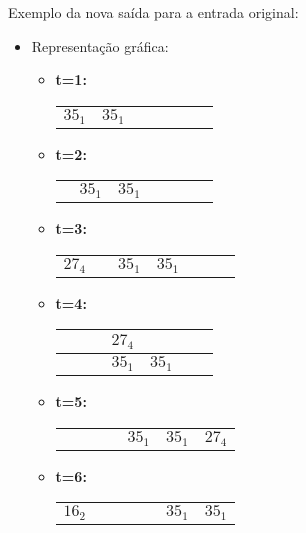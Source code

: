 Exemplo da nova saída para a entrada original:
\begin{itemize}
    \item Representação gráfica:
    \begin{itemize}
        \item \textbf{t=1:} \begin{tabular}{|p{1cm}|p{1cm}|p{1cm}|p{1cm}|p{1cm}|p{1cm}|p{1cm}|}
            \hline & & & & & &\\
            \hline $35_1$&$35_1$& & & & &\\ \hline \end{tabular}
        \item \textbf{t=2:} \begin{tabular}{|p{1cm}|p{1cm}|p{1cm}|p{1cm}|p{1cm}|p{1cm}|p{1cm}|}
            \hline & & & & & &\\ 
            \hline &$35_1$& $35_1$& & & &\\ \hline \end{tabular}
        \item \textbf{t=3:} \begin{tabular}{|p{1cm}|p{1cm}|p{1cm}|p{1cm}|p{1cm}|p{1cm}|p{1cm}|}
            \hline & & & & & &\\ 
            \hline $27_4$& & $35_1$&$35_1$ & & &\\ \hline \end{tabular}
        \item \textbf{t=4:} \begin{tabular}{|p{1cm}|p{1cm}|p{1cm}|p{1cm}|p{1cm}|p{1cm}|p{1cm}|}
            \hline & & & $27_4$& & &\\ 
            \hline & & & $35_1$& $35_1$& &\\ \hline \end{tabular}
        \item \textbf{t=5:} \begin{tabular}{|p{1cm}|p{1cm}|p{1cm}|p{1cm}|p{1cm}|p{1cm}|p{1cm}|}
            \hline & & & & & &\\ 
            \hline & & & & $35_1$& $35_1$&$27_4$\\ \hline \end{tabular} 
        \item \textbf{t=6:} \begin{tabular}{|p{1cm}|p{1cm}|p{1cm}|p{1cm}|p{1cm}|p{1cm}|p{1cm}|}
            \hline & & & & & &\\ 
            \hline $16_2$& & & & & $35_1$& $35_1$ \\ \hline \end{tabular} 

\end{itemize}
\end{itemize}
